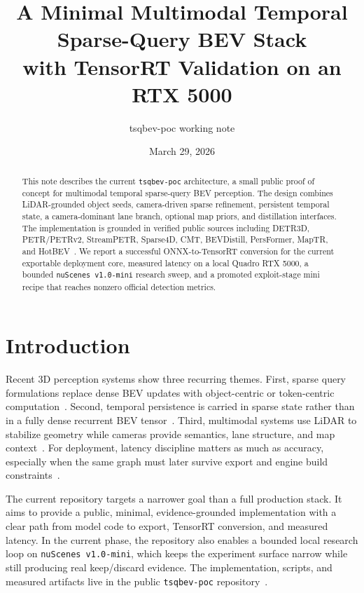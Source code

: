 \documentclass[11pt]{article}
\title{A Minimal Multimodal Temporal Sparse-Query BEV Stack\\with TensorRT Validation on an RTX 5000}
\author{tsqbev-poc working note}
\date{March 29, 2026}
\begin{document}
\maketitle

\begin{abstract}
This note describes the current \texttt{tsqbev-poc} architecture, a small public proof of concept for multimodal temporal sparse-query BEV perception. The design combines LiDAR-grounded object seeds, camera-driven sparse refinement, persistent temporal state, a camera-dominant lane branch, optional map priors, and distillation interfaces. The implementation is grounded in verified public sources including DETR3D, PETR/PETRv2, StreamPETR, Sparse4D, CMT, BEVDistill, PersFormer, MapTR, and HotBEV~\cite{detr3d,petr,petrv2,streampetr,sparse4d,cmt,bevdistill,persformer,maptr,hotbev}. We report a successful ONNX-to-TensorRT conversion for the current exportable deployment core, measured latency on a local Quadro RTX 5000, a bounded \texttt{nuScenes v1.0-mini} research sweep, and a promoted exploit-stage mini recipe that reaches nonzero official detection metrics.
\end{abstract}

\section{Introduction}
Recent 3D perception systems show three recurring themes. First, sparse query formulations replace dense BEV updates with object-centric or token-centric computation~\cite{detr3d,petr,sparse4d}. Second, temporal persistence is carried in sparse state rather than in a fully dense recurrent BEV tensor~\cite{petrv2,streampetr}. Third, multimodal systems use LiDAR to stabilize geometry while cameras provide semantics, lane structure, and map context~\cite{cmt,bevdistill,persformer,maptr}. For deployment, latency discipline matters as much as accuracy, especially when the same graph must later survive export and engine build constraints~\cite{hotbev}.

The current repository targets a narrower goal than a full production stack. It aims to provide a public, minimal, evidence-grounded implementation with a clear path from model code to export, TensorRT conversion, and measured latency. In the current phase, the repository also enables a bounded local research loop on \texttt{nuScenes v1.0-mini}, which keeps the experiment surface narrow while still producing real keep/discard evidence. The implementation, scripts, and measured artifacts live in the public \texttt{tsqbev-poc} repository~\cite{repo,nuscenes}.
\end{document}
